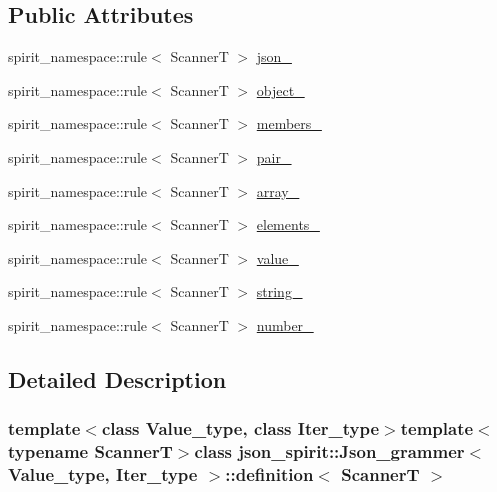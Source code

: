 \subsection*{Public Attributes}
\begin{DoxyCompactItemize}
\item 
spirit\+\_\+namespace\+::rule$<$ Scanner\+T $>$ \hyperlink{classjson__spirit_1_1_json__grammer_1_1definition_a2a4514fb3de3c730ab06a9efabed0cd2}{json\+\_\+}
\item 
spirit\+\_\+namespace\+::rule$<$ Scanner\+T $>$ \hyperlink{classjson__spirit_1_1_json__grammer_1_1definition_a4610053a045e001c3c2a949974449a0b}{object\+\_\+}
\item 
spirit\+\_\+namespace\+::rule$<$ Scanner\+T $>$ \hyperlink{classjson__spirit_1_1_json__grammer_1_1definition_a47e593c30af21ca336a5e0b8643fbf0c}{members\+\_\+}
\item 
spirit\+\_\+namespace\+::rule$<$ Scanner\+T $>$ \hyperlink{classjson__spirit_1_1_json__grammer_1_1definition_ad69f68497d5955a0c432760e07e32523}{pair\+\_\+}
\item 
spirit\+\_\+namespace\+::rule$<$ Scanner\+T $>$ \hyperlink{classjson__spirit_1_1_json__grammer_1_1definition_a0bf73f379e424f5e3b60318c6161aa7f}{array\+\_\+}
\item 
spirit\+\_\+namespace\+::rule$<$ Scanner\+T $>$ \hyperlink{classjson__spirit_1_1_json__grammer_1_1definition_a43473ad5f8e968259fbef7b28e793b58}{elements\+\_\+}
\item 
spirit\+\_\+namespace\+::rule$<$ Scanner\+T $>$ \hyperlink{classjson__spirit_1_1_json__grammer_1_1definition_aef39f18976abab0f07c8cc52379ab7aa}{value\+\_\+}
\item 
spirit\+\_\+namespace\+::rule$<$ Scanner\+T $>$ \hyperlink{classjson__spirit_1_1_json__grammer_1_1definition_a0f8f712ca15aba3f388c5ca4e7a5fd07}{string\+\_\+}
\item 
spirit\+\_\+namespace\+::rule$<$ Scanner\+T $>$ \hyperlink{classjson__spirit_1_1_json__grammer_1_1definition_a664513d2923170ddf2a27fadc5116eb5}{number\+\_\+}
\end{DoxyCompactItemize}


\subsection{Detailed Description}
\subsubsection*{template$<$class Value\+\_\+type, class Iter\+\_\+type$>$template$<$typename Scanner\+T$>$class json\+\_\+spirit\+::\+Json\+\_\+grammer$<$ Value\+\_\+type, Iter\+\_\+type $>$\+::definition$<$ Scanner\+T $>$}



